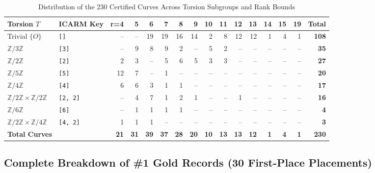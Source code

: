 \documentclass[10pt,a4paper]{article}
\theoremstyle{plain}
\theoremstyle{definition}
\theoremstyle{remark}
\begin{document}
\begin{table}[htbp]
\centering
\footnotesize
\setlength{\tabcolsep}{3.8pt}
\caption{Distribution of the 230 Certified Curves Across Torsion Subgroups and Rank Bounds}
\label{tab:torsion_rank_dist}
\begin{tabular}{llrrrrrrrrrrrrrr}
\toprule
\textbf{Torsion $T$} & \textbf{ICARM Key} & \textbf{r=4} & \textbf{5} & \textbf{6} & \textbf{7} & \textbf{8} & \textbf{9} & \textbf{10} & \textbf{11} & \textbf{12} & \textbf{13} & \textbf{14} & \textbf{15} & \textbf{19} & \textbf{Total} \\
\midrule
Trivial $\{O\}$ & \texttt{[]} & -- & -- & 19 & 19 & 16 & 14 & 2 & 8 & 12 & 12 & 1 & 4 & 1 & \textbf{108} \\
$\mathbb{Z}/3\mathbb{Z}$ & \texttt{[3]} & -- & 9 & 8 & 9 & 2 & -- & 5 & 2 & -- & -- & -- & -- & -- & \textbf{35} \\
$\mathbb{Z}/2\mathbb{Z}$ & \texttt{[2]} & 2 & 3 & -- & 5 & 6 & 5 & 3 & 3 & -- & -- & -- & -- & -- & \textbf{27} \\
$\mathbb{Z}/5\mathbb{Z}$ & \texttt{[5]} & 12 & 7 & -- & 1 & -- & -- & -- & -- & -- & -- & -- & -- & -- & \textbf{20} \\
$\mathbb{Z}/4\mathbb{Z}$ & \texttt{[4]} & 6 & 6 & 3 & 1 & 1 & -- & -- & -- & -- & -- & -- & -- & -- & \textbf{17} \\
$\mathbb{Z}/2\mathbb{Z} \times \mathbb{Z}/2\mathbb{Z}$ & \texttt{[2, 2]} & -- & 4 & 7 & 1 & 2 & 1 & -- & -- & 1 & -- & -- & -- & -- & \textbf{16} \\
$\mathbb{Z}/6\mathbb{Z}$ & \texttt{[6]} & -- & 1 & 1 & 1 & 1 & -- & -- & -- & -- & -- & -- & -- & -- & \textbf{4} \\
$\mathbb{Z}/2\mathbb{Z} \times \mathbb{Z}/4\mathbb{Z}$ & \texttt{[4, 2]} & 1 & 1 & 1 & -- & -- & -- & -- & -- & -- & -- & -- & -- & -- & \textbf{3} \\
\midrule
\textbf{Total Curves} & & \textbf{21} & \textbf{31} & \textbf{39} & \textbf{37} & \textbf{28} & \textbf{20} & \textbf{10} & \textbf{13} & \textbf{13} & \textbf{12} & \textbf{1} & \textbf{4} & \textbf{1} & \textbf{230} \\
\bottomrule
\end{tabular}
\end{table}

\subsection{Complete Breakdown of \#1 Gold Records (30 First-Place Placements)}
\end{document}
